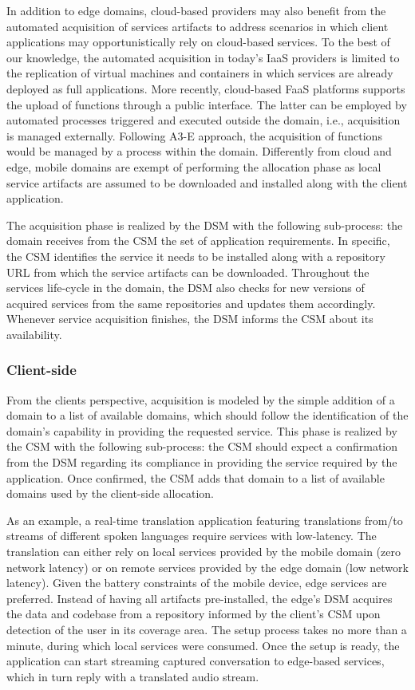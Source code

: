 In addition to edge domains, cloud-based providers may also benefit from the automated acquisition of services artifacts to address scenarios in which client applications may opportunistically rely on cloud-based services. To the best of our knowledge, the automated acquisition in today's IaaS providers is limited to the replication of virtual machines and containers in which services are already deployed as full applications. More recently, cloud-based FaaS platforms supports the upload of functions through a public interface. The latter can be employed by automated processes triggered and executed outside the domain, i.e., acquisition is managed externally. Following A3-E approach, the acquisition of functions would be managed by a process within the domain. Differently from cloud and edge, mobile domains are exempt of performing the allocation phase as local service artifacts are assumed to be downloaded and installed along with the client application.

The acquisition phase is realized by the DSM with the following sub-process: the domain receives from the CSM the set of application requirements. In specific, the CSM identifies the service it needs to be installed along with a repository URL from which the service artifacts can be downloaded. Throughout the services life-cycle in the domain, the DSM also checks for new versions of acquired services from the same repositories and updates them accordingly. Whenever service acquisition finishes, the DSM informs the CSM about its availability.

\subsubsection*{Client-side} From the clients perspective, acquisition is modeled by the simple addition of a domain to a list of available domains, which should follow the identification of the domain's capability in providing the requested service. This phase is realized by the CSM with the following sub-process: the CSM should expect a confirmation from the DSM regarding its compliance in providing the service required by the application. Once confirmed, the CSM adds that domain to a list of available domains used by the client-side allocation. 

As an example, a real-time translation application featuring translations from/to streams of different spoken languages require services with low-latency. The translation can either rely on local services provided by the mobile domain (zero network latency) or on remote services provided by the edge domain (low network latency). Given the battery constraints of the mobile device, edge services are preferred. Instead of having all artifacts pre-installed, the edge's DSM acquires the data and codebase from a repository informed by the client's CSM upon detection of the user in its coverage area. The setup process takes no more than a minute, during which local services were consumed. Once the setup is ready, the application can start streaming captured conversation to edge-based services, which in turn reply with a translated audio stream.


